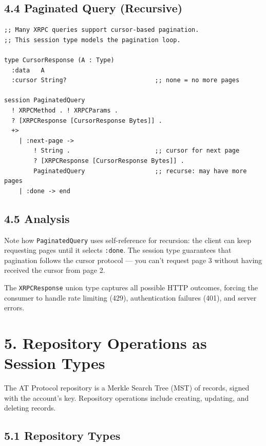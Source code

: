 \documentclass[11pt]{article}
\begin{document}
\subsection{4.4 Paginated Query (Recursive)}
\label{sec:org8442f90}

\begin{verbatim}
;; Many XRPC queries support cursor-based pagination.
;; This session type models the pagination loop.

type CursorResponse (A : Type)
  :data   A
  :cursor String?                        ;; none = no more pages

session PaginatedQuery
  ! XRPCMethod . ! XRPCParams .
  ? [XRPCResponse [CursorResponse Bytes]] .
  +>
    | :next-page ->
        ! String .                       ;; cursor for next page
        ? [XRPCResponse [CursorResponse Bytes]] .
        PaginatedQuery                   ;; recurse: may have more pages
    | :done -> end
\end{verbatim}
\subsection{4.5 Analysis}
\label{sec:org0503c64}

Note how \texttt{PaginatedQuery} uses self-reference for recursion: the client can
keep requesting pages until it selects \texttt{:done}. The session type guarantees
that pagination follows the cursor protocol --- you can't request page 3
without having received the cursor from page 2.

The \texttt{XRPCResponse} union type captures all possible HTTP outcomes, forcing
the consumer to handle rate limiting (429), authentication failures (401),
and server errors.
\section{5. Repository Operations as Session Types}
\label{sec:orgb3bac6f}

The AT Protocol repository is a Merkle Search Tree (MST) of records, signed
with the account's key. Repository operations include creating, updating,
and deleting records.
\subsection{5.1 Repository Types}
\label{sec:org7a02fd6}
\end{document}
